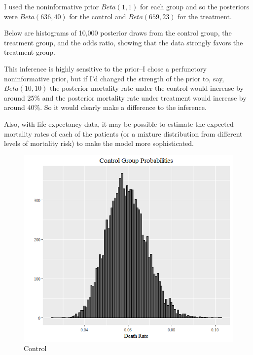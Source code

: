 \documentclass{article}
\begin{document}
I used the noninformative prior \(Beta(1,1)\) for each group and so the posteriors
were \(Beta(636, 40)\) for the control and \(Beta(659, 23)\) for the treatment.

Below are histograms of 10,000 posterior draws from the control group, the treatment group,
and the odds ratio, showing that the data strongly favors the treatment group.

This inference is highly sensitive to the prior--I chose a perfunctory noninformative prior, but if I'd changed the strength of the prior to, say, \(Beta(10,10)\) the posterior mortality rate under the control would increase by around 25\% and the posterior mortality rate under treatment would increase by around 40\%. So it would clearly make a difference to the inference.

Also, with life-expectancy data, it may be possible to estimate the expected mortality rates of each of the patients (or a mixture distribution from different levels of mortality risk) to make the model more sophisticated.

\begin{figure}[!ht]
  \caption{Control}
  \centering
    \includegraphics[width=\textwidth]{Problem34--Control}
\end{figure}
\end{document}
